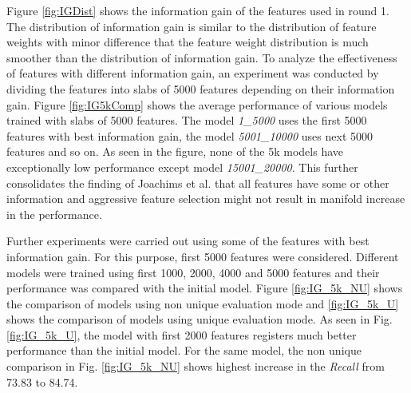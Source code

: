 Figure \ref{fig:IGDist} shows the information gain of the features used in round 1. The distribution of information gain is similar to the distribution of feature weights with minor difference that the feature weight distribution is much smoother than the distribution of information gain. To analyze the effectiveness of features with different information gain, an experiment was conducted by dividing the features into slabs of 5000 features depending on their information gain. Figure \ref{fig:IG5kComp} shows the average performance of various models trained with slabs of 5000 features. The model \textit{1\_5000} uses the first 5000 features with best information gain, the model \textit{5001\_10000} uses next 5000 features and so on. As seen in the figure, none of the 5k models have exceptionally low performance except model \textit{15001\_20000}. This further consolidates the finding of Joachims et al. \cite{joachims1998text} that all features have some or other information and aggressive feature selection might not result in manifold increase in the performance.

Further experiments were carried out using some of the features with best information gain. For this purpose, first 5000 features were considered. Different models were trained using first 1000, 2000, 4000 and 5000 features and their performance was compared with the initial model.  Figure \ref{fig:IG_5k_NU} shows the comparison of models using non unique evaluation mode and \ref{fig:IG_5k_U} shows the comparison of models using unique evaluation mode. As seen in Fig. \ref{fig:IG_5k_U}, the model with first 2000 features registers much better performance than the initial model. For the same model, the non unique comparison in Fig. \ref{fig:IG_5k_NU} shows highest increase in the \textit{Recall} from 73.83 to 84.74.


